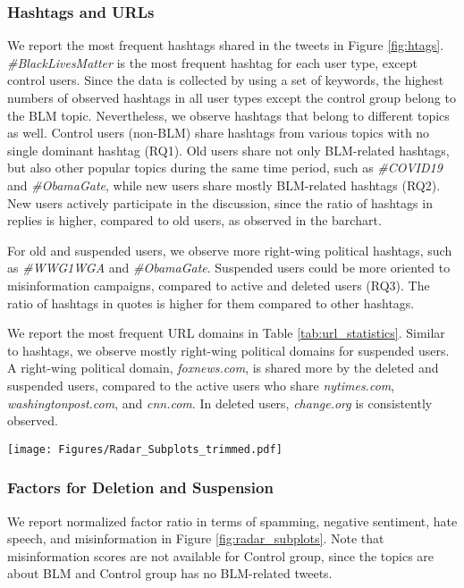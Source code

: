 \documentclass[sigconf]{acmart}
\begin{document}
\subsubsection{Hashtags and URLs}
We report the most frequent hashtags shared in the tweets in Figure \ref{fig:htags}. \emph{\#BlackLivesMatter} is the most frequent hashtag for each user type, except control users. Since the data is collected by using a set of keywords, the highest numbers of observed hashtags in all user types except the control group belong to the BLM topic. Nevertheless, we observe hashtags that belong to different topics as well. Control users (non-BLM) share hashtags from various topics with no single dominant hashtag (RQ1). Old users share not only BLM-related hashtags, but also other popular topics during the same time period, such as \emph{\#COVID19} and \emph{\#ObamaGate}, while new users share mostly BLM-related hashtags (RQ2). New users actively participate in the discussion, since the ratio of hashtags in replies is higher, compared to old users, as observed in the barchart. 

For old and suspended users, we observe more right-wing political hashtags, such as \emph{\#WWG1WGA} and \emph{\#ObamaGate}. Suspended users could be more oriented to misinformation campaigns, compared to active and deleted users (RQ3). The ratio of hashtags in quotes is higher for them compared to other hashtags. 

We report the most frequent URL domains in Table \ref{tab:url_statistics}.
Similar to hashtags, we observe mostly right-wing political domains for suspended users. A right-wing political domain, \emph{foxnews.com}, is shared more by the deleted and suspended users, compared to the active users who share \emph{nytimes.com}, \emph{washingtonpost.com}, and \emph{cnn.com}. In deleted users, \emph{change.org} is consistently observed.

\begin{figure*}[t]
\centering
\texttt{[image: Figures/Radar\_Subplots\_trimmed.pdf]} 
\caption{Normalized factor ratio for spamming, negative sentiment, hate speech, and misinformation spread of old and new users (best viewed in color). Misinformation is not available for Control that has non-BLM users.}
\label{fig:radar_subplots}
\end{figure*}

\subsubsection{Factors for Deletion and Suspension}
We report normalized factor ratio in terms of spamming, negative sentiment, hate speech, and misinformation in Figure \ref{fig:radar_subplots}. Note that misinformation scores are not available for Control group, since the topics are about BLM and Control group has no BLM-related tweets. 
\end{document}
